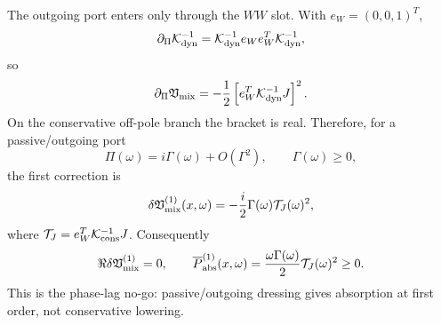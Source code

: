 The outgoing port enters only through the \(WW\) slot.  With \(e_W=(0,0,1)^T\),
\begin{equation}
\label{eq:app-part07-outgoing-derivative}
\partial_\Pi \mathcal K_{\rm dyn}^{-1}
=
\mathcal K_{\rm dyn}^{-1}e_We_W^T\mathcal K_{\rm dyn}^{-1},
\end{equation}
so
\begin{equation}
\label{eq:app-part07-vmix-pi-derivative}
\partial_\Pi\mathfrak V_{\rm mix}
=-\frac12\left[e_W^T\mathcal K_{\rm dyn}^{-1}J\right]^2.
\end{equation}
On the conservative off-pole branch the bracket is real.  Therefore, for a passive/outgoing port
\begin{equation}
\label{eq:app-part07-passive-pi}
\Pi(\omega)=i\Gamma(\omega)+O(\Gamma^2),
\qquad
\Gamma(\omega)\ge0,
\end{equation}
the first correction is
\begin{equation}
\label{eq:app-part07-phase-lag-correction}
\delta\mathfrak V_{\rm mix}^{(1)}(x,\omega)
=-\frac{i}{2}\Gamma(\omega)\mathcal T_J(\omega)^2,
\end{equation}
where \(\mathcal T_J=e_W^T\mathcal K_{\rm cons}^{-1}J\).  Consequently
\begin{equation}
\label{eq:app-part07-phase-lag-no-real}
\Re\delta\mathfrak V_{\rm mix}^{(1)}=0,
\qquad
\overline P_{\rm abs}^{(1)}(x,\omega)
=\frac{\omega\Gamma(\omega)}{2}\mathcal T_J(\omega)^2\ge0.
\end{equation}
This is the phase-lag no-go: passive/outgoing dressing gives absorption at first order, not conservative lowering.


